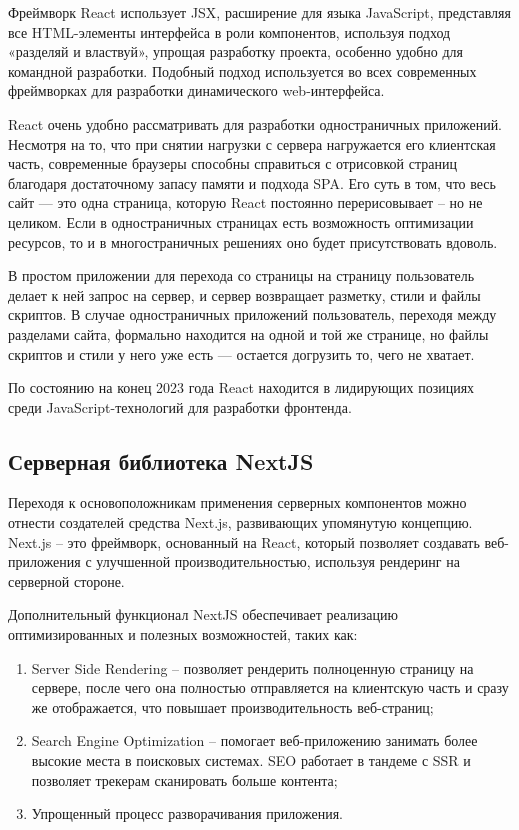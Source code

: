 \documentclass[master, och, diploma]{SCWorks}
\begin{document}
Фреймворк React использует JSX, расширение для языка JavaScript, представляя все HTML-элементы интерфейса в роли компонентов, используя подход «разделяй и властвуй», упрощая разработку проекта, особенно удобно для командной разработки. Подобный подход используется во всех современных фреймворках для разработки динамического web-интерфейса\cite{Ershov_web}.

React очень удобно рассматривать для разработки одностраничных приложений. Несмотря на то, что при снятии нагрузки с сервера нагружается его клиентская часть, современные браузеры способны справиться с отрисовкой страниц благодаря достаточному запасу памяти и подхода SPA. Его суть в том, что весь сайт — это одна страница, которую React постоянно перерисовывает – но не целиком. Если в одностраничных страницах есть возможность оптимизации ресурсов, то и в многостраничных решениях оно будет присутствовать вдоволь.

В простом приложении для перехода со страницы на страницу пользователь делает к ней запрос на сервер, и сервер возвращает разметку, стили и файлы скриптов. В случае одностраничных приложений пользователь, переходя между разделами сайта, формально находится на одной и той же странице, но файлы скриптов и стили у него уже есть — остается догрузить то, чего не хватает. 

По состоянию на конец 2023 года React находится в лидирующих позициях среди JavaScript-технологий для разработки фронтенда\cite{rjs}.



\subsection{Серверная библиотека NextJS}
Переходя к основоположникам применения серверных компонентов можно отнести создателей средства Next.js, развивающих упомянутую концепцию. Next.js – это фреймворк, основанный на React, который позволяет создавать веб-приложения с улучшенной производительностью, используя рендеринг на серверной стороне\cite{Cheprasov2023}.

Дополнительный функционал NextJS обеспечивает реализацию оптимизированных и полезных возможностей, таких как:
\begin{enumerate}
    \item Server Side Rendering – позволяет рендерить полноценную страницу на сервере, после чего она полностью отправляется на клиентскую часть и сразу же отображается, что повышает производительность веб-страниц;
    \item Search Engine Optimization – помогает веб-приложению занимать более высокие места в поисковых системах. SEO работает в тандеме с SSR и позволяет трекерам сканировать больше контента;
    \item Упрощенный процесс разворачивания приложения\cite{Nikitin_nextjs}.
\end{enumerate}
\end{document}
